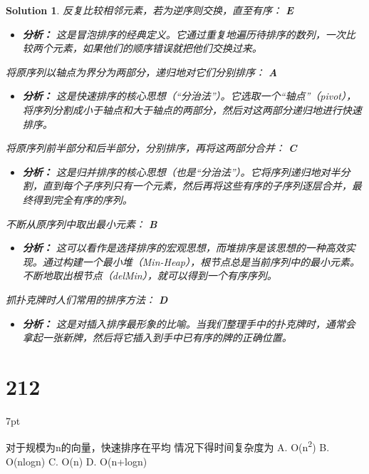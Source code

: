 \documentclass[UTF8]{report}
\newtheorem{solution}{Solution}
\theoremstyle{MyLineTheoremStyle} %
\theoremstyle{MyBlockTheoremStyle} %
\theoremstyle{MySubsubsectionStyle} %
\newenvironment{graybox}{%
        \def\FrameCommand{%
        \hspace{1pt}%
        {\color{gray}\small \vrule width 2pt}%
        {\color{graybox_color}\vrule width 4pt}%
        \colorbox{graybox_color}%
        }%
        \MakeFramed{\advance\hsize-\width\FrameRestore}%
        \noindent\hspace{-4.55pt}%
        \begin{adjustwidth}{}{7pt}%
        \vspace{2pt}\vspace{2pt}%
        }
        {%
        \vspace{2pt}\end{adjustwidth}\endMakeFramed%
        }
\begin{document}
\begin{solution}
反复比较相邻元素，若为逆序则交换，直至有序： \textbf{E}
\begin{itemize}
    \item \textbf{分析：} 这是冒泡排序的经典定义。它通过重复地遍历待排序的数列，一次比较两个元素，如果他们的顺序错误就把他们交换过来。
\end{itemize}

将原序列以轴点为界分为两部分，递归地对它们分别排序： \textbf{A}
\begin{itemize}
    \item \textbf{分析：} 这是快速排序的核心思想（“分治法”）。它选取一个“轴点”（pivot），将序列分割成小于轴点和大于轴点的两部分，然后对这两部分递归地进行快速排序。
\end{itemize}

将原序列前半部分和后半部分，分别排序，再将这两部分合并： \textbf{C}
\begin{itemize}
    \item \textbf{分析：} 这是归并排序的核心思想（也是“分治法”）。它将序列递归地对半分割，直到每个子序列只有一个元素，然后再将这些有序的子序列逐层合并，最终得到完全有序的序列。
\end{itemize}

不断从原序列中取出最小元素： \textbf{B}
\begin{itemize}
    \item \textbf{分析：} 这可以看作是选择排序的宏观思想，而堆排序是该思想的一种高效实现。通过构建一个最小堆（Min-Heap），根节点总是当前序列中的最小元素。不断地取出根节点（delMin），就可以得到一个有序序列。
\end{itemize}

抓扑克牌时人们常用的排序方法： \textbf{D}
\begin{itemize}
    \item \textbf{分析：} 这是对插入排序最形象的比喻。当我们整理手中的扑克牌时，通常会拿起一张新牌，然后将它插入到手中已有序的牌的正确位置。
\end{itemize}
\end{solution}


\section*{212}
\begin{graybox}
对于规模为n的向量，快速排序在平均
情况下得时间复杂度为
A. O(n\textsuperscript{2})
B. O(nlogn)
C. O(n)
D. O(n+logn)
\end{graybox}
\end{document}
